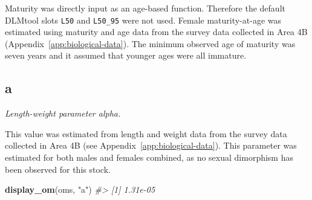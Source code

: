 \documentclass[11pt]{book}
\newenvironment{Shaded}{\begin{snugshade}}{\end{snugshade}}
\newcommand{\CommentTok}[1]{\textcolor[rgb]{0.56,0.35,0.01}{\textit{#1}}}
\newcommand{\ControlFlowTok}[1]{\textcolor[rgb]{0.13,0.29,0.53}{\textbf{#1}}}
\newcommand{\DecValTok}[1]{\textcolor[rgb]{0.00,0.00,0.81}{#1}}
\newcommand{\FloatTok}[1]{\textcolor[rgb]{0.00,0.00,0.81}{#1}}
\newcommand{\KeywordTok}[1]{\textcolor[rgb]{0.13,0.29,0.53}{\textbf{#1}}}
\newcommand{\NormalTok}[1]{#1}
\newcommand{\OperatorTok}[1]{\textcolor[rgb]{0.81,0.36,0.00}{\textbf{#1}}}
\newcommand{\StringTok}[1]{\textcolor[rgb]{0.31,0.60,0.02}{#1}}
\begin{document}
Maturity was directly input as an age-based function. Therefore the default DLMtool slots \texttt{L50} and \texttt{L50\_95} were not used. Female maturity-at-age was estimated using maturity and age data from the survey data collected in Area 4B (Appendix~\ref{app:biological-data}). The minimum observed age of maturity was seven years and it assumed that younger ages were all immature.
\begin{Shaded}
\end{Shaded}
\label{app:desc-stock-a-yelloweye}
\subsection{a}

\emph{Length-weight parameter alpha.}

This value was estimated from length and weight data from the survey data collected in Area 4B (see Appendix~\ref{app:biological-data}). This parameter was estimated for both males and females combined, as no sexual dimorphism has been observed for this stock.
\begin{Shaded}
\begin{Highlighting}[]
\KeywordTok{display_om}\NormalTok{(oms, }\StringTok{"a"}\NormalTok{)}
\CommentTok{#> [1] 1.31e-05}
\end{Highlighting}
\end{Shaded}
\label{app:desc-stock-b-yelloweye}
\end{document}
